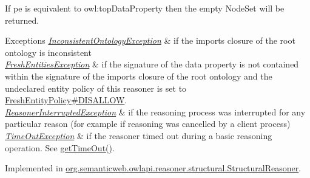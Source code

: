 If {\ttfamily pe} is equivalent to {\ttfamily owl\-:top\-Data\-Property} then the empty {\ttfamily Node\-Set} will be returned.


\begin{DoxyExceptions}{Exceptions}
{\em \hyperlink{classorg_1_1semanticweb_1_1owlapi_1_1reasoner_1_1_inconsistent_ontology_exception}{Inconsistent\-Ontology\-Exception}} & if the imports closure of the root ontology is inconsistent \\
\hline
{\em \hyperlink{classorg_1_1semanticweb_1_1owlapi_1_1reasoner_1_1_fresh_entities_exception}{Fresh\-Entities\-Exception}} & if the signature of the data property is not contained within the signature of the imports closure of the root ontology and the undeclared entity policy of this reasoner is set to \hyperlink{enumorg_1_1semanticweb_1_1owlapi_1_1reasoner_1_1_fresh_entity_policy_a762eae6d5b2449d125311ecaabfdc8d0}{Fresh\-Entity\-Policy\#\-D\-I\-S\-A\-L\-L\-O\-W}. \\
\hline
{\em \hyperlink{classorg_1_1semanticweb_1_1owlapi_1_1reasoner_1_1_reasoner_interrupted_exception}{Reasoner\-Interrupted\-Exception}} & if the reasoning process was interrupted for any particular reason (for example if reasoning was cancelled by a client process) \\
\hline
{\em \hyperlink{classorg_1_1semanticweb_1_1owlapi_1_1reasoner_1_1_time_out_exception}{Time\-Out\-Exception}} & if the reasoner timed out during a basic reasoning operation. See \hyperlink{interfaceorg_1_1semanticweb_1_1owlapi_1_1reasoner_1_1_o_w_l_reasoner_a44b2c968f989afe5290db29c90faa164}{get\-Time\-Out()}. \\
\hline
\end{DoxyExceptions}


Implemented in \hyperlink{classorg_1_1semanticweb_1_1owlapi_1_1reasoner_1_1structural_1_1_structural_reasoner_a414eee69b2181906981fe1aefb97f3ff}{org.\-semanticweb.\-owlapi.\-reasoner.\-structural.\-Structural\-Reasoner}.

